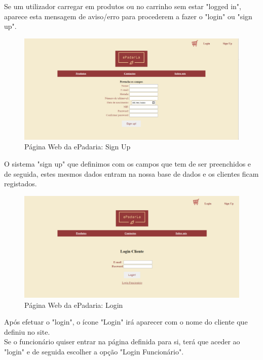 Se um utilizador carregar em produtos ou no carrinho sem estar "logged in", aparece esta mensagem de aviso/erro para procederem a fazer o "login" ou "sign up".

\begin{figure}[H]
	\centering
	\includegraphics[width=15cm]{"mockup sig in"}
	\caption{Página Web da ePadaria: Sign Up}
	\label{fig:mockup-sig-in}
\end{figure}

O sistema "sign up" que definimos com os campos que tem de ser preenchidos e de seguida, estes mesmos dados entram na nossa base de dados e os clientes ficam registados.

\begin{figure}[H]
	\centering
	\includegraphics[width=15cm]{"mockup log in"}
	\caption{Página Web da ePadaria: Login}
	\label{fig:mockup-log-in}
\end{figure}

Após efetuar o "login", o ícone "Login"  irá aparecer com o nome do cliente que definiu no site.\\
Se o funcionário quiser entrar na página definida para si, terá que aceder ao "login"  e de seguida escolher a opção  "Login Funcionário".

